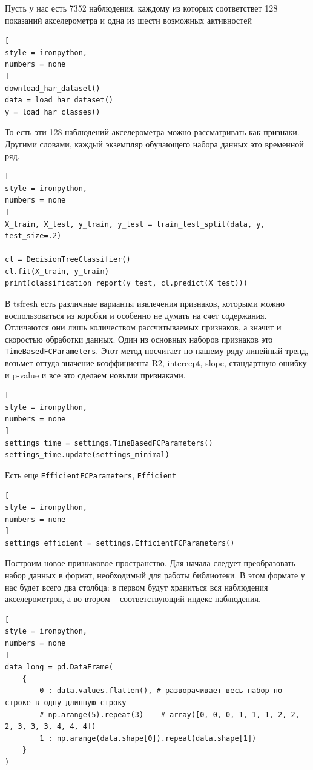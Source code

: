 \documentclass[%
	11pt,
	a4paper,
	utf8,
		]{article}
\begin{document}
Пусть у нас есть 7352 наблюдения, каждому из которых соответствет 128 показаний акселерометра и одна из шести возможных активностей
\begin{lstlisting}[
style = ironpython,
numbers = none	
]
download_har_dataset()
data = load_har_dataset()
y = load_har_classes()
\end{lstlisting}

То есть эти 128 наблюдений акселерометра можно рассматривать как признаки. Другими словами, каждый экземпляр обучающего набора данных это временной ряд.
\begin{lstlisting}[
style = ironpython,
numbers = none	
]
X_train, X_test, y_train, y_test = train_test_split(data, y, test_size=.2)

cl = DecisionTreeClassifier()
cl.fit(X_train, y_train)
print(classification_report(y_test, cl.predict(X_test)))
\end{lstlisting}

В tsfresh есть различные варианты извлечения признаков, которыми можно воспользоваться из коробки и особенно не думать на счет содержания. Отличаются они лишь количеством рассчитываемых признаков, а значит и скоростью обработки данных. Один из основных наборов признаков это \texttt{TimeBasedFCParameters}. Этот метод посчитает по нашему ряду линейный тренд, возьмет оттуда значение коэффициента R2, intercept, slope, стандартную ошибку и p-value и все это сделаем новыми признаками.

\begin{lstlisting}[
style = ironpython,
numbers = none	
]
settings_time = settings.TimeBasedFCParameters()
settings_time.update(settings_minimal)
\end{lstlisting}

Есть еще \texttt{EfficientFCParameters}, \texttt{Efficient}
\begin{lstlisting}[
style = ironpython,
numbers = none	
]
settings_efficient = settings.EfficientFCParameters()
\end{lstlisting}

Построим новое признаковое пространство. Для начала следует преобразовать набор данных в формат, необходимый для работы библиотеки. В этом формате у нас будет всего два столбца: в первом будут храниться вся наблюдения акселерометров, а во втором -- соответствующий индекс наблюдения.
\begin{lstlisting}[
style = ironpython,
numbers = none	
]
data_long = pd.DataFrame(
    {
        0 : data.values.flatten(), # разворачивает весь набор по строке в одну длинную строку
        # np.arange(5).repeat(3)    # array([0, 0, 0, 1, 1, 1, 2, 2, 2, 3, 3, 3, 4, 4, 4])
        1 : np.arange(data.shape[0]).repeat(data.shape[1])
    }
)
\end{lstlisting}
\end{document}
